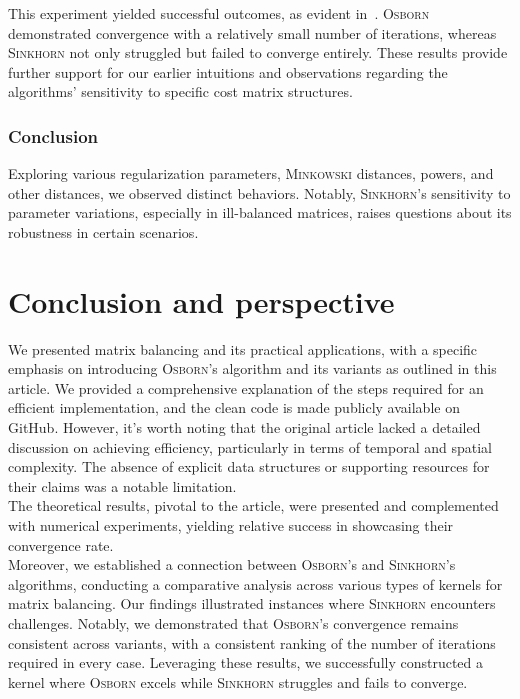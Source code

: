 This experiment yielded successful outcomes, as evident in~. \textsc{Osborn} demonstrated convergence with a relatively small number of iterations, whereas \textsc{Sinkhorn} not only struggled but failed to converge entirely. These results provide further support for our earlier intuitions and observations regarding the algorithms' sensitivity to specific cost matrix structures.

\subsubsection{Conclusion}

Exploring various regularization parameters, \textsc{Minkowski} distances, powers, and other distances, we observed distinct behaviors. Notably, \textsc{Sinkhorn}'s sensitivity to parameter variations, especially in ill-balanced matrices, raises questions about its robustness in certain scenarios.

\section{Conclusion and perspective}

We presented matrix balancing and its practical applications, with a specific emphasis on introducing \textsc{Osborn}'s algorithm and its variants as outlined in this article. We provided a comprehensive explanation of the steps required for an efficient implementation, and the clean code is made publicly available on GitHub. However, it's worth noting that the original article lacked a detailed discussion on achieving efficiency, particularly in terms of temporal and spatial complexity. The absence of explicit data structures or supporting resources for their claims was a notable limitation.\\

The theoretical results, pivotal to the article, were presented and complemented with numerical experiments, yielding relative success in showcasing their convergence rate.\\

Moreover, we established a connection between \textsc{Osborn}'s and \textsc{Sinkhorn}'s algorithms, conducting a comparative analysis across various types of kernels for matrix balancing. Our findings illustrated instances where \textsc{Sinkhorn} encounters challenges. Notably, we demonstrated that \textsc{Osborn}'s convergence remains consistent across variants, with a consistent ranking of the number of iterations required in every case. Leveraging these results, we successfully constructed a kernel where \textsc{Osborn} excels while \textsc{Sinkhorn} struggles and fails to converge.


